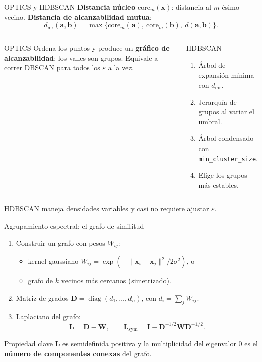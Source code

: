 \documentclass[aspectratio=169,11pt]{beamer}
\newcommand{\x}{\bm{x}}
\begin{document}
\begin{frame}{OPTICS y HDBSCAN}
  \textbf{Distancia núcleo} $\mathrm{core}_m(\x)$: distancia al $m$-ésimo vecino.
  \textbf{Distancia de alcanzabilidad mutua}:
  \[
    d_{\mathrm{mr}}(\bm{a},\bm{b}) = \max\{\mathrm{core}_m(\bm{a}),\ \mathrm{core}_m(\bm{b}),\ d(\bm{a},\bm{b})\}.
  \]
  \begin{columns}[T]
    \begin{block}{OPTICS}
      Ordena los puntos y produce un \textbf{gráfico de alcanzabilidad}: los valles son grupos.
      Equivale a correr DBSCAN para todos los $\varepsilon$ a la vez.
    \end{block}
    \begin{block}{HDBSCAN}
      \begin{enumerate}
        \item Árbol de expansión mínima con $d_{\mathrm{mr}}$.
        \item Jerarquía de grupos al variar el umbral.
        \item Árbol condensado con \texttt{min\_cluster\_size}.
        \item Elige los grupos más \alert{estables}.
      \end{enumerate}
    \end{block}
  \end{columns}
  \vspace{4pt}
  {\small HDBSCAN maneja densidades variables y casi no requiere ajustar $\varepsilon$.}
\end{frame}

\begin{frame}{Agrupamiento espectral: el grafo de similitud}
  \begin{enumerate}
    \item Construir un grafo con pesos $W_{ij}$:
          \begin{itemize}
            \item kernel gaussiano $W_{ij} = \exp(-\lVert\x_i-\x_j\rVert^2/2\sigma^2)$, o
            \item grafo de $k$ vecinos más cercanos (simetrizado).
          \end{itemize}
    \item Matriz de grados $\mathbf{D} = \operatorname{diag}(d_1,\dots,d_n)$, con $d_i = \sum_j W_{ij}$.
    \item Laplaciano del grafo:
          \[
            \mathbf{L} = \mathbf{D} - \mathbf{W},
            \qquad
            \mathbf{L}_{\mathrm{sym}} = \mathbf{I} - \mathbf{D}^{-1/2}\mathbf{W}\mathbf{D}^{-1/2}.
          \]
  \end{enumerate}
  \begin{block}{Propiedad clave}
    $\mathbf{L}$ es semidefinida positiva y la multiplicidad del eigenvalor 0 es el
    \textbf{número de componentes conexas} del grafo.
  \end{block}
\end{frame}
\end{document}
